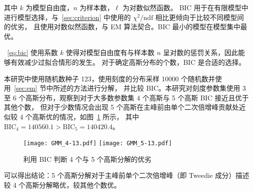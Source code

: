 其中 $k$ 为模型自由度，$n$ 为样本数，$\ell$ 为对数似然函数。
BIC 用于在有限模型中进行模型选择，与~\ref{sec:criterion} 中使用的 $\chi^2/\text{ndf}$ 相比更倾向于比较不同模型间的优劣，
且使用对数似然函数，与 EM 算法契合。BIC 最小的模型在模型集中最优\cite{10.1214/aos/1176344136}。

~\eqref{eq:bic} 使用系数 $k$ 使得对模型自由度有与样本数 $n$ 呈对数的惩罚关系，因此能够有效减少过拟合情形的发生。
对于确定高斯分布的个数，BIC 是合适的选择。

本研究中使用随机数种子 123，使用刻度的分布采样 10000 个随机数并使用~\ref{sec:em} 节中所述的方法进行分解，
并比较 BIC。本研究对刻度参数集使用 3 至 6 个高斯分布，观察到对于大多数参数集 4 个高斯与 5 个高斯 BIC 接近且优于其他个数，
但对于少数情况会出现 5 个高斯在主峰前由单个二次倍增峰贡献处近似较 4 个高斯优的情况，如图~\ref{fig:multi-image} 所示，
其中 $\text{BIC}_4=140560.1>\text{BIC}_5=140420.4$。

\begin{figure}
    \centering
      {\texttt{[image: GMM\_4-13.pdf]}}
      {\texttt{[image: GMM\_5-13.pdf]}}
    \caption{利用 BIC 判断 4 个与 5 个高斯分解的优劣}
    \label{fig:multi-image}
\end{figure}

可以得出结论：5 个高斯分解对于主峰前单个二次倍增峰（即 Tweedie 成分）描述较 4 个高斯分解略优，较其他个数优。
